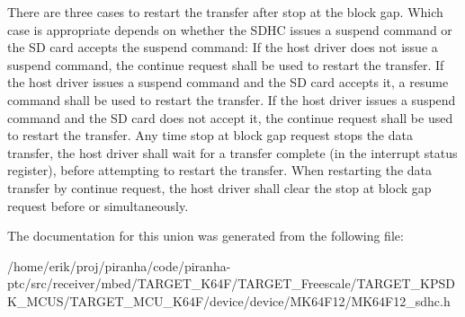 There are three cases to restart the transfer after stop at the block gap. Which case is appropriate depends on whether the S\+D\+HC issues a suspend command or the SD card accepts the suspend command\+: If the host driver does not issue a suspend command, the continue request shall be used to restart the transfer. If the host driver issues a suspend command and the SD card accepts it, a resume command shall be used to restart the transfer. If the host driver issues a suspend command and the SD card does not accept it, the continue request shall be used to restart the transfer. Any time stop at block gap request stops the data transfer, the host driver shall wait for a transfer complete (in the interrupt status register), before attempting to restart the transfer. When restarting the data transfer by continue request, the host driver shall clear the stop at block gap request before or simultaneously. 

The documentation for this union was generated from the following file\+:\begin{DoxyCompactItemize}
\item 
/home/erik/proj/piranha/code/piranha-\/ptc/src/receiver/mbed/\+T\+A\+R\+G\+E\+T\+\_\+\+K64\+F/\+T\+A\+R\+G\+E\+T\+\_\+\+Freescale/\+T\+A\+R\+G\+E\+T\+\_\+\+K\+P\+S\+D\+K\+\_\+\+M\+C\+U\+S/\+T\+A\+R\+G\+E\+T\+\_\+\+M\+C\+U\+\_\+\+K64\+F/device/device/\+M\+K64\+F12/M\+K64\+F12\+\_\+sdhc.\+h\end{DoxyCompactItemize}
